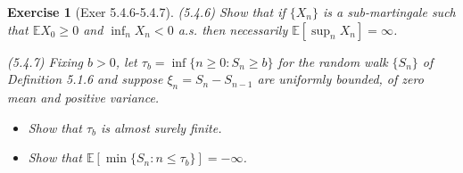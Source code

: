 \documentclass[11pt,a4paper]{article}
\numberwithin{equation}{section}%
\newtheorem{exercise}{Exercise}[]
\begin{document}
\begin{exercise}[Exer 5.4.6-5.4.7]

    (5.4.6) Show that if $\{X_n\}$ is a sub-martingale such that $\mathbb{E}X_0 \geq 0$ and $\inf_n X_n < 0$ a.s. then necessarily $\mathbb{E}[\sup_n X_n] = \infty$.

    (5.4.7) Fixing $b > 0$, let $\tau_b = \inf\{n \geq 0 : S_n \geq b\}$ for the random walk $\{S_n\}$ of Definition 5.1.6 and suppose $\xi_n = S_n - S_{n-1}$ are uniformly bounded, of zero mean and positive variance.
    \begin{itemize}[topsep=0pt,itemsep=-8pt]
        \item Show that $\tau_b$ is almost surely finite.
        \item Show that $\mathbb{E}[\min\{S_n : n \leq \tau_b\}] = -\infty$.
    \end{itemize}

\end{exercise}
\end{document}
